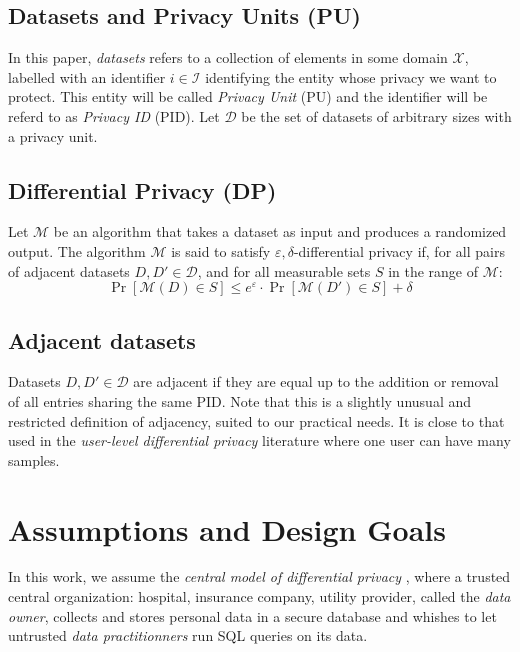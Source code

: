 \documentclass[letterpaper]{article} %
\begin{document}
\subsection*{Datasets and Privacy Units (PU)}

In this paper, \emph{datasets} refers to a collection of elements in some domain $\mathcal{X}$, labelled with an identifier $i\in \mathcal{I}$ identifying the entity whose privacy we want to protect. This entity will be called \emph{Privacy Unit} (PU) and the identifier will be referd to as \emph{Privacy ID} (PID). Let $\mathcal{D}$ be the set of datasets of arbitrary sizes with a privacy unit.

\subsection*{Differential Privacy (DP)}

Let $\mathcal{M}$ be an algorithm that takes a dataset as input and produces a randomized output. The algorithm $\mathcal{M}$ is said to satisfy $\varepsilon,\delta$-differential privacy if, for all pairs of adjacent datasets $D, D' \in \mathcal{D}$, and for all measurable sets $S$ in the range of $\mathcal{M}$:
$$\Pr[\mathcal{M}(D) \in S] \leq e^{\varepsilon} \cdot \Pr[\mathcal{M}(D') \in S] + \delta$$

\subsection*{Adjacent datasets}

Datasets $D, D' \in \mathcal{D}$ are adjacent if they are equal up to the addition or removal of all entries sharing the same PID. Note that this is a slightly unusual and restricted definition of adjacency, suited to our practical needs. It is close to that used in the \emph{user-level differential privacy} literature \cite{liu2020learning, wilson2019differentially} where one user can have many samples.

\section{Assumptions and Design Goals}

In this work, we assume the \emph{central model of differential privacy} \cite{near2020threat}, where a trusted central organization: hospital, insurance company, utility provider, called the \emph{data owner}, collects and stores personal data in a secure database and whishes to let untrusted \emph{data practitionners} run SQL queries on its data.
\end{document}
